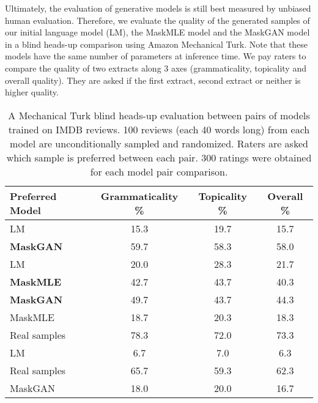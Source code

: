 Ultimately, the evaluation of generative models is still best measured by unbiased human evaluation.  Therefore, we evaluate the quality of the generated samples of our initial language model (LM), the MaskMLE model and the MaskGAN model in a blind heads-up comparison using Amazon Mechanical Turk. Note that these models have the same number of parameters at inference time. We pay raters to compare the quality of two extracts along 3 axes (grammaticality, topicality and overall quality). They are asked if the first extract, second extract or neither is higher quality.

\begin{table}[h]
  \centering
  \begin{tabular}{lccc}
    \toprule
    Preferred Model & Grammaticality \% & Topicality \% & Overall \% \\
    \midrule
    LM & 15.3 & 19.7 & 15.7 \\
    \textbf{MaskGAN} & 59.7 & 58.3 & 58.0 \\
    \midrule
    LM & 20.0 & 28.3 & 21.7 \\
    \textbf{MaskMLE} & 42.7 & 43.7 & 40.3 \\
    \midrule
    \textbf{MaskGAN} & 49.7 & 43.7 & 44.3 \\
    MaskMLE & 18.7 & 20.3 & 18.3 \\
    \midrule
    Real samples & 78.3 & 72.0 & 73.3 \\
    LM & 6.7 & 7.0 & 6.3 \\
    \midrule
    Real samples & 65.7 & 59.3 & 62.3 \\
    MaskGAN & 18.0 & 20.0 & 16.7 \\
    \bottomrule
  \end{tabular}
  \caption{A Mechanical Turk blind heads-up evaluation between pairs of models trained on IMDB reviews. 100 reviews (each 40 words long) from each model are unconditionally sampled and randomized. Raters are asked which sample is preferred between each pair. 300 ratings were obtained for each model pair comparison.}
\end{table}
